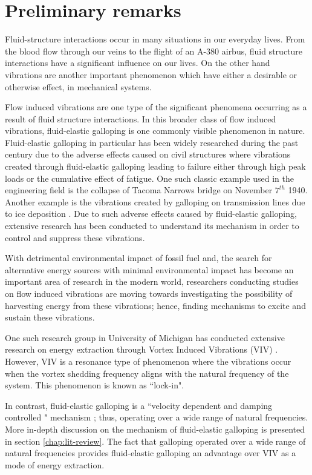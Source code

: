 \chapter{Preliminary remarks}

Fluid-structure interactions occur in many situations in our everyday lives. From the blood flow through our veins to the flight of an A-380 airbus, fluid structure interactions have a significant influence on our lives. On the other hand vibrations are another important phenomenon which have either a desirable or otherwise effect, in mechanical systems.  


Flow induced vibrations are one type of the significant phenomena occurring as a result of fluid structure interactions. In this broader class of flow induced vibrations, fluid-elastic galloping is one commonly visible phenomenon in nature. Fluid-elastic galloping in particular has been widely researched during the past century due to the adverse effects caused on civil structures where vibrations created through fluid-elastic galloping  leading to failure either through high peak loads or the cumulative effect of fatigue. One such classic example used in the engineering field is the collapse of Tacoma Narrows bridge on November $7^{th}$ 1940. Another example is the vibrations created by galloping on transmission lines due to ice deposition \citep{Parkinson1964}. Due to such adverse effects caused by fluid-elastic galloping, extensive research has been conducted to understand its mechanism in order to control and suppress these vibrations.  

With detrimental environmental impact of  fossil fuel and, the search for alternative energy sources with minimal environmental impact has become an important area of research in the modern world, researchers conducting studies on flow induced vibrations are moving towards investigating the possibility of harvesting energy from these vibrations; hence, finding mechanisms to excite and sustain these vibrations\citep{Barrero-Gil2010a}.  

One such research group in University of Michigan has conducted extensive research on energy extraction through Vortex Induced Vibrations (VIV) \citep{Bernitsas2008a-concept, Bernitsas2009, Raghavan2010a, Lee2011b}. However, VIV is a resonance type of phenomenon where the vibrations occur when the vortex shedding frequency aligns with the natural frequency of the system. This phenomenon is known as ``lock-in".

In contrast, fluid-elastic galloping is a ``velocity dependent and damping controlled " mechanism \citep{Paidoussis2010}; thus, operating over a wide range of natural frequencies.  More in-depth discussion on the mechanism of fluid-elastic galloping is presented in section \ref{chap:lit-review}. The fact that galloping operated over a wide range of natural frequencies provides fluid-elastic galloping an advantage over VIV as a mode of energy extraction.

